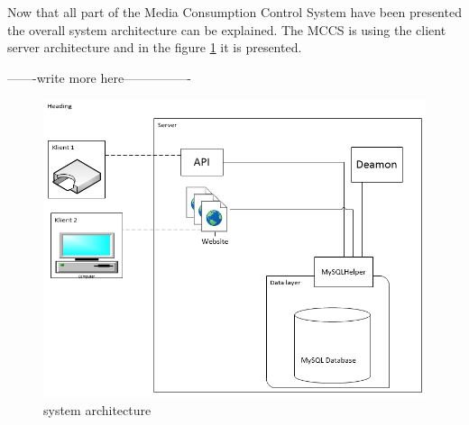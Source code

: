 Now that all part of the Media Consumption Control System have been presented the overall system architecture can be explained. The MCCS is using the client server architecture and in the figure \ref{fig:serveroverview} it is presented.

-------write more here----------------

\begin{figure}
	\centering
		\includegraphics[width=1.00\textwidth]{images/serveroverview.jpg}
	\caption{system architecture}
	\label{fig:serveroverview}
\end{figure}
 


